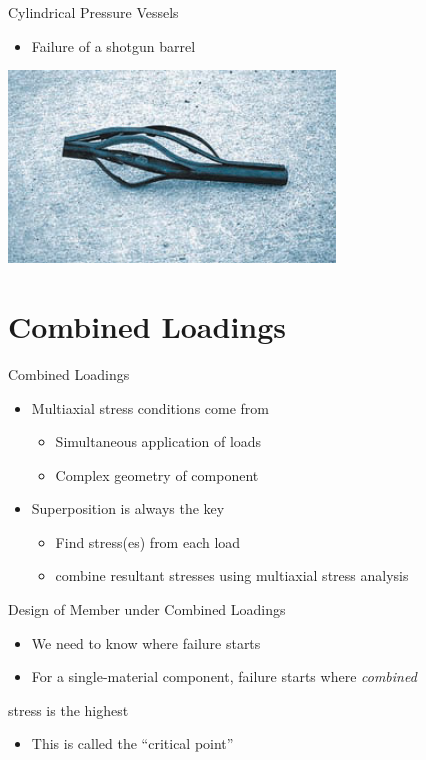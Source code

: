 \documentclass[10pt, svgnames]{beamer}
\begin{document}
\begin{frame}[label={sec:org10441a0}]{Cylindrical Pressure Vessels}
\begin{itemize}
\item Failure of a shotgun barrel
\end{itemize}

\begin{center}
\includegraphics[width=.9\linewidth]{./pictures/shotgun-barrel.png}
\end{center}
\end{frame}

\section{Combined Loadings}
\label{sec:org50413d4}

\begin{frame}[label={sec:org70072e4}]{Combined Loadings}
\begin{itemize}
\item Multiaxial stress conditions come from
\begin{itemize}
\item Simultaneous application of loads
\item Complex geometry of component
\end{itemize}
\item Superposition is always the key
\begin{itemize}
\item Find stress(es) from each load
\item combine resultant stresses using multiaxial stress analysis
\end{itemize}
\end{itemize}
\end{frame}

\begin{frame}[label={sec:org3b03178}]{Design of Member under Combined Loadings}
\begin{itemize}
\item We need to know where failure starts
\item For a single-material component, failure starts where \emph{combined}
\end{itemize}
stress is the highest
\begin{itemize}
\item This is called the ``critical point''
\end{itemize}
\end{frame}
\end{document}

